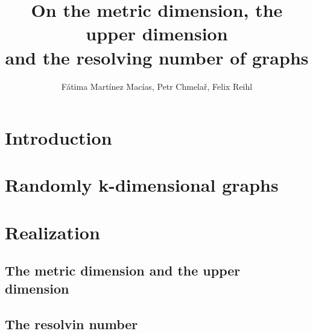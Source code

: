 \documentclass[hyperref={pdfpagelabels=false}]{beamer}
\title{On the metric dimension, the upper dimension\\ and the resolving number of graphs}
\author{Fátima Martínez Macías, Petr Chmela\v{r}, Felix Reihl}
\date{}
\begin{document}
\begin{frame}
	\titlepage
\end{frame} 
\begin{frame}
	\tableofcontents
\end{frame} 
\section{Introduction}
\begin{frame}
\end{frame}
\section{Randomly k-dimensional graphs}
\begin{frame}
\end{frame}
\section{Realization}
\subsection{The metric dimension and the upper dimension}
\begin{frame}
\end{frame}
\subsection{The resolvin number}
\begin{frame}
\end{frame}
\end{document}

